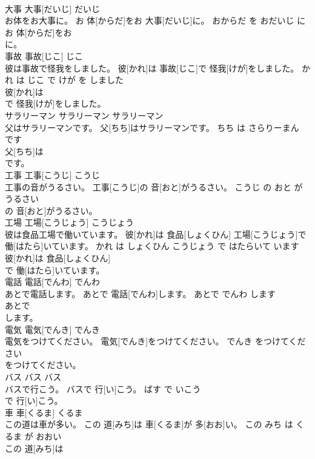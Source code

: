 \documentclass[8pt]{extreport}
\begin{document}
\begin{CJK}{UTF8}{min}
\\	大事	大事[だいじ]	だいじ	
\\	お体をお大事に。	お 体[からだ]をお 大事[だいじ]に。	おからだ を おだいじ に	
\\	お 体[からだ]をお
\\	に。			
\\	事故	事故[じこ]	じこ	
\\	彼は事故で怪我をしました。	彼[かれ]は 事故[じこ]で 怪我[けが]をしました。	かれ は じこ で けが を しました	
\\	彼[かれ]は
\\	で 怪我[けが]をしました。			
\\	サラリーマン	サラリーマン	サラリーマン	
\\	父はサラリーマンです。	父[ちち]はサラリーマンです。	ちち は さらりーまん です	
\\	父[ちち]は
\\	です。			
\\	工事	工事[こうじ]	こうじ	
\\	工事の音がうるさい。	工事[こうじ]の 音[おと]がうるさい。	こうじ の おと が うるさい	
\\	の 音[おと]がうるさい。			
\\	工場	工場[こうじょう]	こうじょう	
\\	彼は食品工場で働いています。	彼[かれ]は 食品[しょくひん] 工場[こうじょう]で 働[はたら]いています。	かれ は しょくひん こうじょう で はたらいて います	
\\	彼[かれ]は 食品[しょくひん]
\\	で 働[はたら]いています。			
\\	電話	電話[でんわ]	でんわ	
\\	あとで電話します。	あとで 電話[でんわ]します。	あとで でんわ します	
\\	あとで
\\	します。			
\\	電気	電気[でんき]	でんき	
\\	電気をつけてください。	電気[でんき]をつけてください。	でんき をつけてください	
\\	をつけてください。			
\\	バス	バス	バス	
\\	バスで行こう。	バスで 行[い]こう。	ばす で いこう	
\\	で 行[い]こう。			
\\	車	車[くるま]	くるま	
\\	この道は車が多い。	この 道[みち]は 車[くるま]が 多[おお]い。	この みち は くるま が おおい	
\\	この 道[みち]は

\end{CJK}
\end{document}
